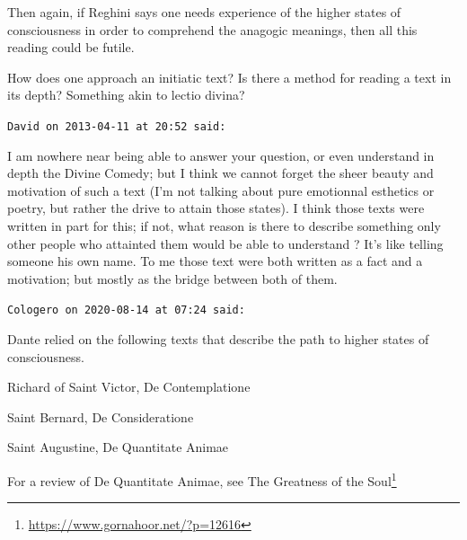 \begin{footnotesize}
\begin{sffamily}
Then again, if Reghini says one needs experience of the higher states of consciousness in order to comprehend the anagogic meanings, then all this reading could be futile.

How does one approach an initiatic text? Is there a method for reading a text in its depth? Something akin to lectio divina?


\hfill

\texttt{David on 2013-04-11 at 20:52 said: }

I am nowhere near being able to answer your question, or even understand in depth the Divine Comedy; but I think we cannot forget the sheer beauty and motivation of such a text (I'm not talking about pure emotionnal esthetics or poetry, but rather the drive to attain those states). I think those texts were written in part for this; if not, what reason is there to describe something only other people who attainted them would be able to understand ? It's like telling someone his own name. To me those text were both written as a fact and a motivation; but mostly as the bridge between both of them.


\hfill

\texttt{Cologero on 2020-08-14 at 07:24 said: }

Dante relied on the following texts that describe the path to higher states of consciousness.

Richard of Saint Victor, De Contemplatione

Saint Bernard, De Consideratione

Saint Augustine, De Quantitate Animae

For a review of De Quantitate Animae, see The Greatness of the Soul\footnote{\url{https://www.gornahoor.net/?p=12616}}


\end{sffamily}\end{footnotesize}
